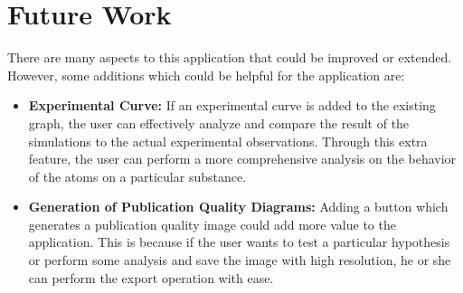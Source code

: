 \section*{Future Work}

There are many aspects to this application that could be improved or extended. However, some additions which could be helpful for the application are:

\begin{itemize}
  \item \textbf{Experimental Curve:} If an experimental curve is added to the existing graph, the user can effectively analyze and compare the result of the simulations to the actual experimental observations. Through this extra feature, the user can perform a more comprehensive analysis on the behavior of the atoms on a particular substance.

  \item \textbf{Generation of Publication Quality Diagrams:} Adding a button which generates a publication quality image could add more value to the application. This is because if the user wants to test a particular hypothesis or perform some analysis and save the image with high resolution, he or she can perform the export operation with ease. 

\end{itemize}